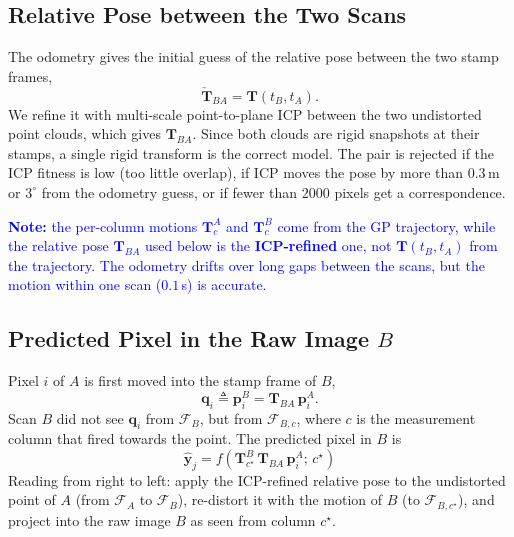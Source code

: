 \subsection{Relative Pose between the Two Scans}
The odometry gives the initial guess of the relative pose between the two stamp frames,
\begin{equation}
    \check{\mathbf{T}}_{BA} = \mathbf{T}(t_B, t_A).
\end{equation}
We refine it with multi-scale point-to-plane ICP between the two undistorted point clouds, which gives $\mathbf{T}_{BA}$. Since both clouds are rigid snapshots at their stamps, a single rigid transform is the correct model. The pair is rejected if the ICP fitness is low (too little overlap), if ICP moves the pose by more than $0.3$\,m or $3^{\circ}$ from the odometry guess, or if fewer than $2000$ pixels get a correspondence.

\textcolor{blue}{\textbf{Note:} the per-column motions $\mathbf{T}^{A}_{c}$ and $\mathbf{T}^{B}_{c}$ come from the GP trajectory, while the relative pose $\mathbf{T}_{BA}$ used below is the \textbf{ICP-refined} one, not $\mathbf{T}(t_B, t_A)$ from the trajectory. The odometry drifts over long gaps between the scans, but the motion within one scan ($0.1$\,s) is accurate.}

\subsection{Predicted Pixel in the Raw Image $B$}
Pixel $i$ of $A$ is first moved into the stamp frame of $B$,
\begin{equation}
    \mathbf{q}_i \triangleq \mathbf{p}_i^{B} = \mathbf{T}_{BA}\,\mathbf{p}_i^{A}.
\end{equation}
Scan $B$ did not see $\mathbf{q}_i$ from $\mathcal{F}_{B}$, but from $\mathcal{F}_{B,c}$, where $c$ is the measurement column that fired towards the point. The predicted pixel in $B$ is
\begin{equation}
    \label{eq:pred_pixel}
    \boxed{\;\hat{\mathbf{y}}_j = f\left(\mathbf{T}^{B}_{c^{\star}}\,\mathbf{T}_{BA}\,\mathbf{p}_i^{A};\, c^{\star}\right)\;}
\end{equation}
Reading from right to left: apply the ICP-refined relative pose to the undistorted point of $A$ (from $\mathcal{F}_{A}$ to $\mathcal{F}_{B}$), re-distort it with the motion of $B$ (to $\mathcal{F}_{B,c^{\star}}$), and project into the raw image $B$ as seen from column $c^{\star}$.

